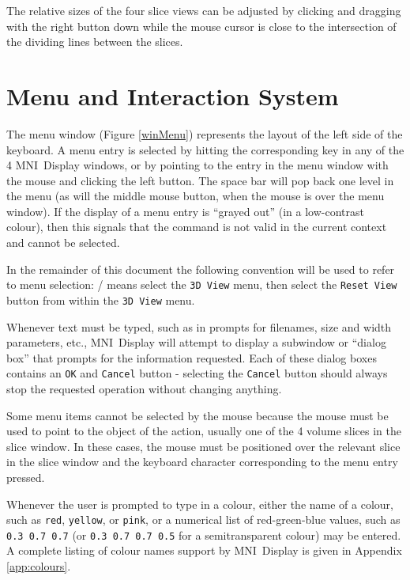 \documentclass[11pt,letterpaper]{article}
\newcommand{\ident}[1]{{\tt #1}}
\newcommand{\display}{\mbox{MNI Display}}
\newcommand{\menutwo}[2]{{\scriptsize \fbox{\bf #1}/\fbox{\bf #2}}}
\begin{document}
The relative sizes of the four slice views can be adjusted by clicking
and dragging with the right button down while the mouse cursor is
close to the intersection of the dividing lines between the slices.

\section{Menu and Interaction System}

The menu window (Figure \ref{winMenu}) represents the
layout of the left side of the keyboard.  A menu entry is selected by
hitting the corresponding key in any of the 4 \display{} windows, or
by pointing to the entry in the menu window with the mouse and
clicking the left button. The space bar will pop back one level in the
menu (as will the middle mouse button, when the mouse is over the menu
window). If the display of a menu entry is ``grayed out'' (in a
low-contrast colour), then this signals that the command is not valid
in the current context and cannot be selected.

In the remainder of this document the following convention will be
used to refer to menu selection: \menutwo{3D View}{Reset View} means
select the \ident{3D View} menu, then select the \ident{Reset View}
button from within the \ident{3D View} menu.

Whenever text must be typed, such as in prompts for filenames, size
and width parameters, etc., \display{} will attempt to display a
subwindow or ``dialog box'' that prompts for the information
requested. Each of these dialog boxes contains an \ident{OK} and
\ident{Cancel} button - selecting the \ident{Cancel} button should
always stop the requested operation without changing anything.

Some menu items cannot be selected by the mouse because the mouse must
be used to point to the object of the action, usually one of the 4
volume slices in the slice window.  In these cases, the mouse must be
positioned over the relevant slice in the slice window and the
keyboard character corresponding to the menu entry pressed.

Whenever the user is prompted to type in a colour, either the name of
a colour, such as \ident{red}, \ident{yellow}, or \ident{pink}, or a
numerical list of red-green-blue values, such as \mbox{\ident{0.3 0.7 0.7}}
(or \mbox{\ident{0.3 0.7 0.7 0.5}} for a semitransparent colour) may
be entered. A complete listing of colour names support by \display{} is
given in Appendix \ref{app:colours}.
\end{document}
